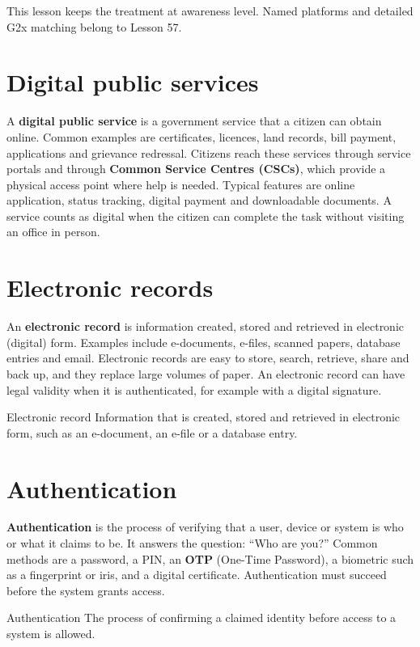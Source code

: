This lesson keeps the treatment at awareness level. Named platforms and
detailed G2x matching belong to Lesson 57.

\section{Digital public services}
A \textbf{digital public service} is a government service that a citizen can
obtain online. Common examples are certificates, licences, land records, bill
payment, applications and grievance redressal. Citizens reach these services
through service portals and through \textbf{Common Service Centres (CSCs)},
which provide a physical access point where help is needed. Typical features
are online application, status tracking, digital payment and downloadable
documents. A service counts as digital when the citizen can complete the task
without visiting an office in person.

\section{Electronic records}
An \textbf{electronic record} is information created, stored and retrieved in
electronic (digital) form. Examples include e-documents, e-files, scanned
papers, database entries and email. Electronic records are easy to store,
search, retrieve, share and back up, and they replace large volumes of paper.
An electronic record can have legal validity when it is authenticated, for
example with a digital signature.

\begin{definitionbox}{Electronic record}
Information that is created, stored and retrieved in electronic form, such as
an e-document, an e-file or a database entry.
\end{definitionbox}

\section{Authentication}
\textbf{Authentication} is the process of verifying that a user, device or
system is who or what it claims to be. It answers the question: ``Who are
you?'' Common methods are a password, a PIN, an \textbf{OTP} (One-Time
Password), a biometric such as a fingerprint or iris, and a digital
certificate. Authentication must succeed before the system grants access.

\begin{definitionbox}{Authentication}
The process of confirming a claimed identity before access to a system is
allowed.
\end{definitionbox}

